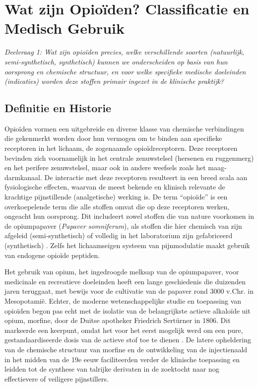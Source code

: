 \documentclass[11pt, a4paper]{report} %
\begin{document}
\chapter{Wat zijn Opioïden? Classificatie en Medisch Gebruik}
\label{chap:wat_zijn_opioiden}
\textit{Deelvraag 1: Wat zijn opioïden precies, welke verschillende soorten (natuurlijk, semi-synthetisch, synthetisch) kunnen we onderscheiden op basis van hun oorsprong en chemische structuur, en voor welke specifieke medische doeleinden (indicaties) worden deze stoffen primair ingezet in de klinische praktijk?}

\section{Definitie en Historie}
Opioïden vormen een uitgebreide en diverse klasse van chemische verbindingen die gekenmerkt worden door hun vermogen om te binden aan specifieke receptoren in het lichaam, de zogenaamde opioïdreceptoren. Deze receptoren bevinden zich voornamelijk in het centrale zenuwstelsel (hersenen en ruggenmerg) en het perifere zenuwstelsel, maar ook in andere weefsels zoals het maag-darmkanaal. De interactie met deze receptoren resulteert in een breed scala aan fysiologische effecten, waarvan de meest bekende en klinisch relevante de krachtige pijnstillende (analgetische) werking is. De term \enquote{opioïde} is een overkoepelende term die alle stoffen omvat die op deze receptoren werken, ongeacht hun oorsprong. Dit includeert zowel stoffen die van nature voorkomen in de opiumpapaver (\textit{Papaver somniferum}), als stoffen die hier chemisch van zijn afgeleid (semi-synthetisch) of volledig in het laboratorium zijn gefabriceerd (synthetisch) \parencite{SciELO2020Opioids}. Zelfs het lichaamseigen systeem van pijnmodulatie maakt gebruik van endogene opioïde peptiden.

Het gebruik van opium, het ingedroogde melksap van de opiumpapaver, voor medicinale en recreatieve doeleinden heeft een lange geschiedenis die duizenden jaren teruggaat, met bewijs voor de cultivatie van de papaver rond 3000 v.Chr. in Mesopotamië. Echter, de moderne wetenschappelijke studie en toepassing van opioïden begon pas echt met de isolatie van de belangrijkste actieve alkaloïde uit opium, morfine, door de Duitse apotheker Friedrich Sertürner in 1806. Dit markeerde een keerpunt, omdat het voor het eerst mogelijk werd om een pure, gestandaardiseerde dosis van de actieve stof toe te dienen \parencite{SciELO2020Opioids}. De latere opheldering van de chemische structuur van morfine en de ontwikkeling van de injectienaald in het midden van de 19e eeuw faciliteerden verder de klinische toepassing en leidden tot de synthese van talrijke derivaten in de zoektocht naar nog effectievere of veiligere pijnstillers.
\end{document}
